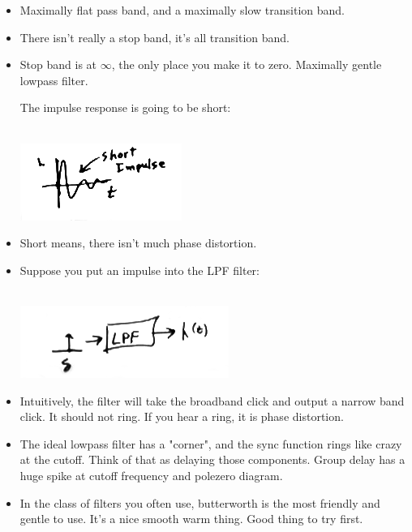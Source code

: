 \begin{itemize}
\item{Maximally flat pass band, and a maximally slow transition band. }
\item{There isn't really a stop band, it's all transition band.}
\item{Stop band is at $\infty$, the only place you make it to zero. 
    Maximally gentle lowpass filter.} 

The impulse response is going to be short:

 \\
\includegraphics[scale=0.5]{frames/15c}

\item{Short means, there isn't much phase distortion.}

\item{Suppose you put an impulse into the LPF filter: 

 \\
\includegraphics[scale=0.5]{frames/15d}
}

\item{Intuitively, the filter will take the broadband click and output a narrow
    band click. It should not ring. If you hear a ring, it is phase distortion. }

\item{The ideal lowpass filter has a "corner", and the sync function rings like
crazy at the cutoff. Think of that as delaying those components. 
Group delay has a huge spike at cutoff frequency and polezero diagram.}


\item{In the class of filters you often use, butterworth is the most friendly and
    gentle to use. It's a nice smooth warm thing. Good thing to try first.}


\end{itemize}
